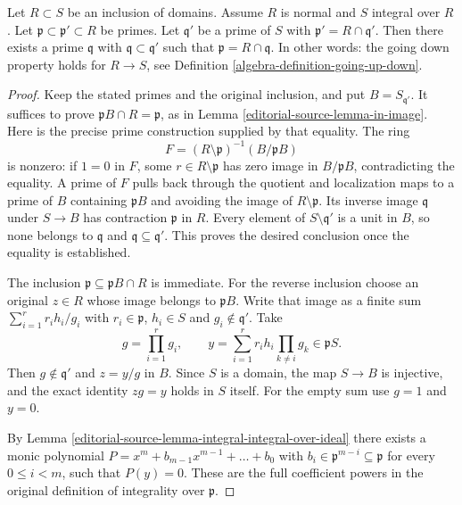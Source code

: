 \begin{proposition}
\label{editorial-source-proposition-going-down-normal-integral}
Let $R \subset S$ be an inclusion of domains.
Assume $R$ is normal and $S$ integral over $R$.
Let $\mathfrak p \subset \mathfrak p' \subset R$
be primes. Let $\mathfrak q'$ be a prime of $S$
with $\mathfrak p' = R \cap \mathfrak q'$.
Then there exists a prime $\mathfrak q$
with $\mathfrak q \subset \mathfrak q'$
such that $\mathfrak p = R \cap \mathfrak q$. In other words:
the going down property holds for $R \to S$, see
Definition \ref{algebra-definition-going-up-down}.
\end{proposition}

\begin{proof}
Keep the stated primes and the original inclusion, and put
$B=S_{\mathfrak q'}$. It suffices to prove
$\mathfrak pB\cap R=\mathfrak p$, as in Lemma \ref{editorial-source-lemma-in-image}.
Here is the precise prime construction supplied by that equality.
The ring
$$
F=(R\setminus\mathfrak p)^{-1}(B/\mathfrak pB)
$$
is nonzero: if $1=0$ in $F$, some $r\in R\setminus\mathfrak p$
has zero image in $B/\mathfrak pB$, contradicting the equality.
A prime of $F$ pulls back through the quotient and localization
maps to a prime of $B$ containing $\mathfrak pB$ and avoiding
the image of $R\setminus\mathfrak p$. Its inverse image
$\mathfrak q$ under $S\to B$ has contraction $\mathfrak p$
in $R$. Every element of $S\setminus\mathfrak q'$ is a unit
in $B$, so none belongs to $\mathfrak q$ and
$\mathfrak q\subseteq\mathfrak q'$. This proves the desired
conclusion once the equality is established.

The inclusion $\mathfrak p\subseteq\mathfrak pB\cap R$ is
immediate. For the reverse inclusion choose an original
$z\in R$ whose image belongs to $\mathfrak pB$. Write that
image as a finite sum $\sum_{i=1}^r r_i h_i/g_i$ with
$r_i\in\mathfrak p$, $h_i\in S$ and $g_i\notin\mathfrak q'$.
Take
$$
g=\prod_{i=1}^r g_i,\qquad
y=\sum_{i=1}^r r_i h_i\prod_{k\ne i}g_k\in\mathfrak pS.
$$
Then $g\notin\mathfrak q'$ and $z=y/g$ in $B$. Since $S$
is a domain, the map $S\to B$ is injective, and the exact
identity $zg=y$ holds in $S$ itself. For the empty sum use
$g=1$ and $y=0$.

\medskip\noindent
By Lemma \ref{editorial-source-lemma-integral-integral-over-ideal}
there exists a monic polynomial
$P = x^m + b_{m-1} x^{m-1} + \ldots + b_0$
with $b_i\in\mathfrak p^{m-i}\subseteq\mathfrak p$
for every $0\leq i<m$, such that $P(y)=0$.
These are the full coefficient powers in the original definition
of integrality over $\mathfrak p$.


\end{proof}
